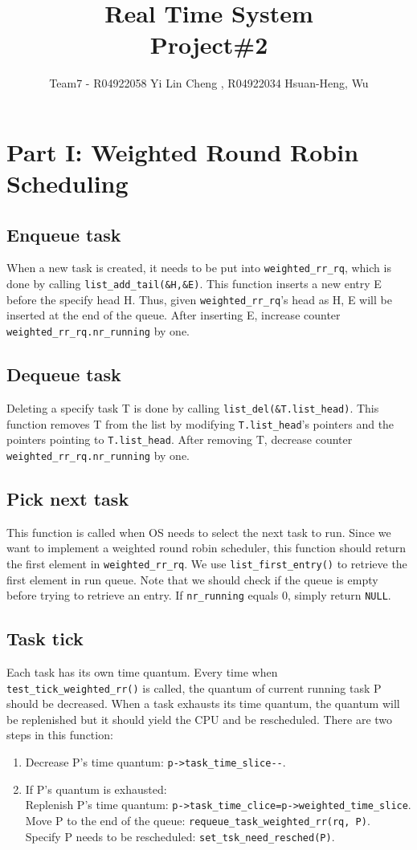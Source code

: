 \documentclass[12pt]{article}
\title{\textbf{Real Time System}\\ Project\#2}
\author{Team7 - R04922058 Yi Lin Cheng , R04922034 Hsuan-Heng, Wu}
\date{}
\begin{document}
\maketitle

\section*{Part I: Weighted Round Robin Scheduling}
\subsection*{Enqueue task}
	When a new task is created, it needs to be put into \verb|weighted_rr_rq|, which is done by calling \verb|list_add_tail(&H,&E)|.
	This function inserts a new entry E before the specify head H. Thus, given \verb|weighted_rr_rq|'s head as H, E will be inserted at the end of the queue. After inserting E, increase counter \verb|weighted_rr_rq.nr_running| by one.

\subsection*{Dequeue task}
	Deleting a specify task T is done by calling \verb|list_del(&T.list_head)|. This function removes T from the list by modifying \verb|T.list_head|'s pointers and the pointers pointing to \verb|T.list_head|. After removing T, decrease counter \verb|weighted_rr_rq.nr_running| by one.

\subsection*{Pick next task}
	This function is called when OS needs to select the next task to run. Since we want to implement a weighted round robin scheduler, this function should return the first element in \verb|weighted_rr_rq|. We use \verb|list_first_entry()| to retrieve the first element in run queue. Note that we should check if the queue is empty before trying to retrieve an entry. If \verb|nr_running| equals 0, simply return \verb|NULL|.

\subsection*{Task tick}
	Each task has its own time quantum. Every time when \verb|test_tick_weighted_rr()| is called, the quantum of current running task P should be decreased. When a task exhausts its time quantum, the quantum will be replenished but it should yield the CPU and be rescheduled. There are two steps in this function:
	\begin{enumerate}
		\item Decrease P's time quantum:  \verb|p->task_time_slice--|.
		\item If P's quantum is exhausted:\\
			Replenish P's time quantum: \verb|p->task_time_clice=p->weighted_time_slice|.\\
			Move P to the end of the queue: \verb|requeue_task_weighted_rr(rq, P)|.\\
			Specify P needs to be rescheduled: \verb|set_tsk_need_resched(P)|.
	\end{enumerate}
\end{document}
